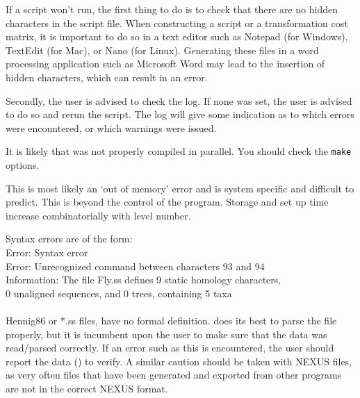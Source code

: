 {If a script won't run, the first thing to do is to check that there
are no hidden characters in the script file.  When constructing a
script or a transformation cost matrix, it is important to do so
in a text editor such as Notepad (for Windows), TextEdit (for Mac),
or Nano (for Linux). Generating these files in a word processing
application such as Microsoft Word may lead to the insertion of
hidden characters, which can result in an error.

Secondly, the user is advised to check the log.  If none was set,
the user is advised to do so and rerun the script.  The log will
give some indication as to which errors were encountered, or which
warnings were issued.}

{It is likely that \poy was not properly compiled
in parallel. You should check the \texttt{make} options.}

{This is most likely an `out of memory' error and is system specific 
and difficult to predict. This is beyond the control of the program. Storage and
set up time increase combinatorially with level number.}

{Syntax errors are of the form: 
\\
Error: Syntax error\\
Error: Unrecognized command between characters 93 and 94 \\
Information: The file Fly.ss defines 9 static homology characters, \\
0 unaligned sequences, and 0 trees, containing 5 taxa\\
\\
Hennig86 or *.ss files, have no formal definition.  \poy does its
best to parse the file properly, but it is incumbent upon the user
to make sure that the data was read/parsed correctly.  If an error
such as this is encountered, the user should report the data
() to verify.  A similar caution should
be taken with NEXUS files, as very often files that have been
generated and exported from other programs are not in the correct
NEXUS format.}

